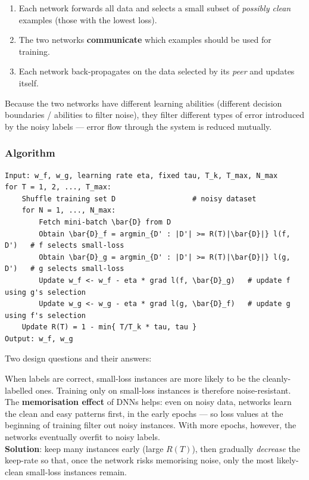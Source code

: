 \documentclass[11pt,a4paper]{article}
\theoremstyle{definition}
\theoremstyle{plain}
\theoremstyle{remark}
\begin{document}
\begin{enumerate}
    \item Each network forwards all data and selects a small subset of \emph{possibly clean} examples (those with the lowest loss).
    \item The two networks \textbf{communicate} which examples should be used for training.
    \item Each network back-propagates on the data selected by its \emph{peer} and updates itself.
\end{enumerate}

Because the two networks have different learning abilities (different decision boundaries / abilities to filter noise), they filter different types of error introduced by the noisy labels --- error flow through the system is reduced mutually.

\subsubsection{Algorithm}

\begin{tcolorbox}[colback=gray!5!white,colframe=gray!60!black,title=\textbf{Algorithm 1: Co-Teaching}]
\begin{verbatim}
Input: w_f, w_g, learning rate eta, fixed tau, T_k, T_max, N_max
for T = 1, 2, ..., T_max:
    Shuffle training set D                  # noisy dataset
    for N = 1, ..., N_max:
        Fetch mini-batch \bar{D} from D
        Obtain \bar{D}_f = argmin_{D' : |D'| >= R(T)|\bar{D}|} l(f, D')   # f selects small-loss
        Obtain \bar{D}_g = argmin_{D' : |D'| >= R(T)|\bar{D}|} l(g, D')   # g selects small-loss
        Update w_f <- w_f - eta * grad l(f, \bar{D}_g)   # update f using g's selection
        Update w_g <- w_g - eta * grad l(g, \bar{D}_f)   # update g using f's selection
    Update R(T) = 1 - min{ T/T_k * tau, tau }
Output: w_f, w_g
\end{verbatim}
\end{tcolorbox}

Two design questions and their answers:

\begin{tcolorbox}[colback=yellow!5!white,colframe=orange!80!black,title=\textbf{Q1: Why select small-loss instances with dynamic $R(T)$?}]
When labels are correct, small-loss instances are more likely to be the cleanly-labelled ones. Training only on small-loss instances is therefore noise-resistant.\\
The \textbf{memorisation effect} of DNNs helps: even on noisy data, networks learn the clean and easy patterns first, in the early epochs --- so loss values at the beginning of training filter out noisy instances. With more epochs, however, the networks eventually overfit to noisy labels.\\
\textbf{Solution}: keep many instances early (large $R(T)$), then gradually \emph{decrease} the keep-rate so that, once the network risks memorising noise, only the most likely-clean small-loss instances remain.
\end{tcolorbox}
\end{document}
